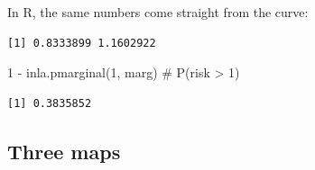 \documentclass[
  letterpaper,
  DIV=11,
  numbers=noendperiod]{scrartcl}
\newenvironment{Shaded}{\begin{snugshade}}{\end{snugshade}}
\newcommand{\CommentTok}[1]{\textcolor[rgb]{0.37,0.37,0.37}{#1}}
\newcommand{\DecValTok}[1]{\textcolor[rgb]{0.68,0.00,0.00}{#1}}
\newcommand{\FloatTok}[1]{\textcolor[rgb]{0.68,0.00,0.00}{#1}}
\newcommand{\FunctionTok}[1]{\textcolor[rgb]{0.28,0.35,0.67}{#1}}
\newcommand{\NormalTok}[1]{\textcolor[rgb]{0.00,0.23,0.31}{#1}}
\newcommand{\OtherTok}[1]{\textcolor[rgb]{0.00,0.23,0.31}{#1}}
\newcommand{\SpecialCharTok}[1]{\textcolor[rgb]{0.37,0.37,0.37}{#1}}
\begin{document}
In R, the same numbers come straight from the curve:

\begin{Shaded}
\end{Shaded}

\begin{verbatim}
[1] 0.8333899 1.1602922
\end{verbatim}

\begin{Shaded}
\begin{Highlighting}[]
\DecValTok{1} \SpecialCharTok{{-}} \FunctionTok{inla.pmarginal}\NormalTok{(}\DecValTok{1}\NormalTok{, marg)                      }\CommentTok{\# P(risk \textgreater{} 1)}
\end{Highlighting}
\end{Shaded}

\begin{verbatim}
[1] 0.3835852
\end{verbatim}

\subsection{Three maps}\label{three-maps}
\end{document}
